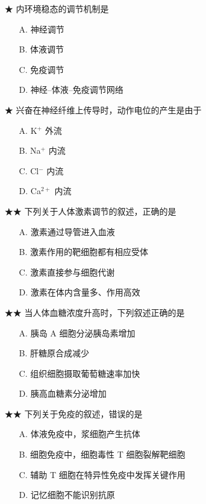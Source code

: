 \begin{enumerate}
  \item[★] 内环境稳态的调节机制是
  \begin{enumerate}
    \item[A.] 神经调节
    \item[B.] 体液调节
    \item[C.] 免疫调节
    \item[D.] 神经--体液--免疫调节网络
  \end{enumerate}
  \vspace{0.8cm}

  \item[★] 兴奋在神经纤维上传导时，动作电位的产生是由于
  \begin{enumerate}
    \item[A.] K$^+$ 外流
    \item[B.] Na$^+$ 内流
    \item[C.] Cl$^-$ 内流
    \item[D.] Ca$^{2+}$ 内流
  \end{enumerate}
  \vspace{0.8cm}

  \item[★★] 下列关于人体激素调节的叙述，正确的是
  \begin{enumerate}
    \item[A.] 激素通过导管进入血液
    \item[B.] 激素作用的靶细胞都有相应受体
    \item[C.] 激素直接参与细胞代谢
    \item[D.] 激素在体内含量多、作用高效
  \end{enumerate}
  \vspace{0.8cm}

  \item[★★] 当人体血糖浓度升高时，下列叙述正确的是
  \begin{enumerate}
    \item[A.] 胰岛 A 细胞分泌胰岛素增加
    \item[B.] 肝糖原合成减少
    \item[C.] 组织细胞摄取葡萄糖速率加快
    \item[D.] 胰高血糖素分泌增加
  \end{enumerate}
  \vspace{0.8cm}

  \item[★★] 下列关于免疫的叙述，错误的是
  \begin{enumerate}
    \item[A.] 体液免疫中，浆细胞产生抗体
    \item[B.] 细胞免疫中，细胞毒性 T 细胞裂解靶细胞
    \item[C.] 辅助 T 细胞在特异性免疫中发挥关键作用
    \item[D.] 记忆细胞不能识别抗原
  \end{enumerate}
  \vspace{0.8cm}


\end{enumerate}
